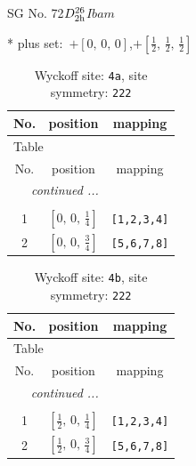 \documentclass[fleqn,8pt]{jsarticle}
\begin{document}
\setcounter{MaxMatrixCols}{32}

\renewcommand{\tablename}{Table~}
\renewcommand{\figurename}{Figure~}
\begin{center}
\LARGE
SG No. 72\quad$D_{\rm 2h}^{26}$\quad$Ibam$\quad[ orthorhombic ]
\end{center}
* plus set:\,\,\,$+\left[ 0,\, 0,\, 0 \right]$,\quad $+\left[ \frac{1}{2},\, \frac{1}{2},\, \frac{1}{2} \right]$
\renewcommand{\arraystretch}{1.2}
\begin{longtable}{ccc}
\caption{Wyckoff site: {\tt 4a}, site symmetry: {\tt 222}}
 \\
 \hline \hline
No. & position & mapping \\ \hline \endfirsthead

\multicolumn{2}{l}{\tablename\ \thetable{}} \\
 \hline \hline
No. & position & mapping \\ \hline \endhead

 \hline \hline
\multicolumn{2}{r}{\footnotesize\it continued ...} \\ \endfoot

 \hline \hline
\multicolumn{2}{r}{} \\ \endlastfoot

1 & $\left[ 0,\, 0,\, \frac{1}{4} \right]$ & {\tt [1,2,3,4]} \\ \hline
2 & $\left[ 0,\, 0,\, \frac{3}{4} \right]$ & {\tt [5,6,7,8]} \\
\end{longtable}
\renewcommand{\arraystretch}{1.2}
\begin{longtable}{ccc}
\caption{Wyckoff site: {\tt 4b}, site symmetry: {\tt 222}}
 \\
 \hline \hline
No. & position & mapping \\ \hline \endfirsthead

\multicolumn{2}{l}{\tablename\ \thetable{}} \\
 \hline \hline
No. & position & mapping \\ \hline \endhead

 \hline \hline
\multicolumn{2}{r}{\footnotesize\it continued ...} \\ \endfoot

 \hline \hline
\multicolumn{2}{r}{} \\ \endlastfoot

1 & $\left[ \frac{1}{2},\, 0,\, \frac{1}{4} \right]$ & {\tt [1,2,3,4]} \\ \hline
2 & $\left[ \frac{1}{2},\, 0,\, \frac{3}{4} \right]$ & {\tt [5,6,7,8]} \\
\end{longtable}
\end{document}
